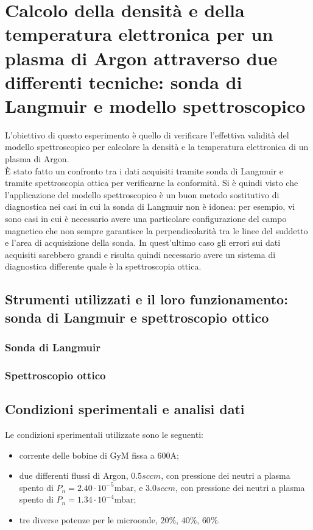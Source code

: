 \chapter{Calcolo della densità e della temperatura elettronica per un plasma di Argon attraverso due differenti tecniche: sonda di Langmuir e modello spettroscopico}


L'obiettivo di questo esperimento è quello di verificare l'effettiva validità del modello spettroscopico per calcolare la densità e la temperatura elettronica di un plasma di Argon.\\
\`E stato fatto un confronto tra i dati acquisiti tramite sonda di Langmuir e tramite spettroscopia ottica per verificarne la conformità. Si è quindi visto che 
l'applicazione del modello spettroscopico è un buon metodo sostitutivo di diagnostica nei casi in cui la sonda di Langmuir non è idonea: per esempio, vi sono casi in cui è necessario 
avere una particolare configurazione del campo magnetico che non sempre garantisce la perpendicolarità tra le linee del suddetto e l'area di acquisizione della sonda. In quest'ultimo
caso gli errori sui dati acquisiti sarebbero grandi e risulta quindi necessario avere un sistema di diagnostica differente quale è la spettroscopia ottica.

\section{Strumenti utilizzati e il loro funzionamento: sonda di Langmuir e spettroscopio ottico}
\label{sec:strumenti}
\subsection{Sonda di Langmuir}
\subsection{Spettroscopio ottico}

\section{Condizioni sperimentali e analisi dati}
Le condizioni sperimentali utilizzate sono le seguenti:
\begin{itemize}
 \item corrente delle bobine di GyM fissa a $600\si{\ampere}$;
 \item due differenti flussi di Argon, $0.5sccm$, con pressione dei neutri a plasma spento di $P_n=2.40\cdot10^{-5}\si{\milli\bar}$, e $3.0sccm$, con pressione dei neutri a plasma spento di $P_n=1.34\cdot10^{-4}\si{\milli\bar}$;
 \item tre diverse potenze per le microonde, $20\%$, $40\%$, $60\%$.
\end{itemize}

